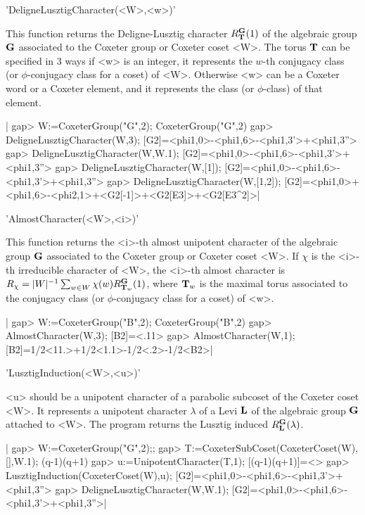 'DeligneLusztigCharacter(<W>,<w>)'

This  function returns the Deligne-Lusztig  character $R_{\bf T}^{\bf G}(1)$ of the
algebraic group ${\bf G}$ associated to the Coxeter group or Coxeter coset <W>.
The  torus ${\bf T}$  can be  specified in  3 ways\:  if <w>  is an  integer, it
represents  the  $w$-th  conjugacy  class  (or $\phi$-conjugacy class for a
coset)  of <W>. Otherwise <w>  can be a Coxeter  word or a Coxeter element,
and it represents the class (or $\phi$-class) of that element.

|    gap> W:=CoxeterGroup("G",2);
    CoxeterGroup("G",2)
    gap> DeligneLusztigCharacter(W,3);
    [G2]=<phi{1,0}>-<phi{1,6}>-<phi{1,3}'>+<phi{1,3}''>
    gap> DeligneLusztigCharacter(W,W.1);
    [G2]=<phi{1,0}>-<phi{1,6}>-<phi{1,3}'>+<phi{1,3}''>
    gap> DeligneLusztigCharacter(W,[1]);
    [G2]=<phi{1,0}>-<phi{1,6}>-<phi{1,3}'>+<phi{1,3}''>
    gap> DeligneLusztigCharacter(W,[1,2]);
    [G2]=<phi{1,0}>+<phi{1,6}>-<phi{2,1}>+<G2[-1]>+<G2[E3]>+<G2[E3^2]>|


'AlmostCharacter(<W>,<i>)'

This  function  returns  the  <i>-th  almost  unipotent  character  of  the
algebraic group ${\bf G}$ associated to the Coxeter group or Coxeter coset <W>.
If  $\chi$ is  the <i>-th  irreducible character  of <W>, the <i>-th almost
character  is $R_\chi=|W|^{-1}\sum_{w\in W}\chi(w) R_{{\bf T}_w}^{\bf G}(1)$, where
${\bf T}_w$  is  the  maximal  torus  associated  to  the  conjugacy  class (or
$\phi$-conjugacy class for a coset) of <w>.

|    gap> W:=CoxeterGroup("B",2);
    CoxeterGroup("B",2)
    gap> AlmostCharacter(W,3);
    [B2]=<.11>
    gap> AlmostCharacter(W,1);
    [B2]=1/2<11.>+1/2<1.1>-1/2<.2>-1/2<B2>|


'LusztigInduction(<W>,<u>)'

<u>  should be a unipotent character of a parabolic subcoset of the Coxeter
coset <W>. It represents a unipotent character $\lambda$ of a Levi ${\bf L}$ of
the  algebraic group ${\bf G}$ attached to <W>. The program returns the Lusztig
induced $R_{\bf L}^{\bf G}(\lambda)$.

|    gap> W:=CoxeterGroup("G",2);;
    gap> T:=CoxeterSubCoset(CoxeterCoset(W),[],W.1);
    (q-1)(q+1)
    gap> u:=UnipotentCharacter(T,1);
    [(q-1)(q+1)]=<>
    gap> LusztigInduction(CoxeterCoset(W),u);
    [G2]=<phi{1,0}>-<phi{1,6}>-<phi{1,3}'>+<phi{1,3}''>
    gap> DeligneLusztigCharacter(W,W.1);
    [G2]=<phi{1,0}>-<phi{1,6}>-<phi{1,3}'>+<phi{1,3}''>|

